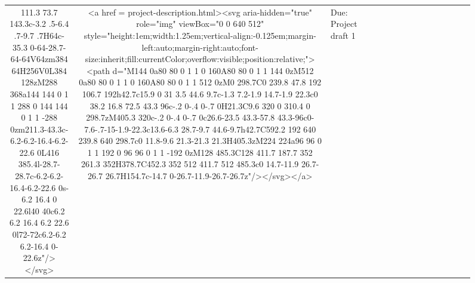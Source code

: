\documentclass[
]{article}
\begin{document}
\begin{figure*}
\begin{longtable*}{cclllccccccccccl}
111.3 73.7 143.3c-3.2 .5-6.4 .7-9.7 .7H64c-35.3 0-64-28.7-64-64V64zm384 64H256V0L384 128zM288 368a144 144 0 1 1 288 0 144 144 0 1 1 -288 0zm211.3-43.3c-6.2-6.2-16.4-6.2-22.6 0L416 385.4l-28.7-28.7c-6.2-6.2-16.4-6.2-22.6 0s-6.2 16.4 0 22.6l40 40c6.2 6.2 16.4 6.2 22.6 0l72-72c6.2-6.2 6.2-16.4 0-22.6z"/></svg> & <a href = project-description.html><svg aria-hidden="true" role="img" viewBox="0 0 640 512" style="height:1em;width:1.25em;vertical-align:-0.125em;margin-left:auto;margin-right:auto;font-size:inherit;fill:currentColor;overflow:visible;position:relative;"><path d="M144 0a80 80 0 1 1 0 160A80 80 0 1 1 144 0zM512 0a80 80 0 1 1 0 160A80 80 0 1 1 512 0zM0 298.7C0 239.8 47.8 192 106.7 192h42.7c15.9 0 31 3.5 44.6 9.7c-1.3 7.2-1.9 14.7-1.9 22.3c0 38.2 16.8 72.5 43.3 96c-.2 0-.4 0-.7 0H21.3C9.6 320 0 310.4 0 298.7zM405.3 320c-.2 0-.4 0-.7 0c26.6-23.5 43.3-57.8 43.3-96c0-7.6-.7-15-1.9-22.3c13.6-6.3 28.7-9.7 44.6-9.7h42.7C592.2 192 640 239.8 640 298.7c0 11.8-9.6 21.3-21.3 21.3H405.3zM224 224a96 96 0 1 1 192 0 96 96 0 1 1 -192 0zM128 485.3C128 411.7 187.7 352 261.3 352H378.7C452.3 352 512 411.7 512 485.3c0 14.7-11.9 26.7-26.7 26.7H154.7c-14.7 0-26.7-11.9-26.7-26.7z"/></svg></a> & Due: Project draft 1 \\ 

\end{longtable*}
\end{figure*}
\end{document}
